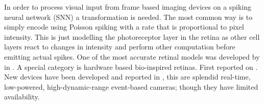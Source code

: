 In order to process visual input from frame based imaging devices on a spiking 
neural network (SNN) a transformation is needed. The most common way is to 
simply encode using Poisson spiking with a rate that is proportional to pixel
intensity. This is just modelling the photoreceptor layer in the retina as 
other cell layers react to changes in intensity\cite{webvision} and perform 
other computation before emitting actual spikes. One of the most accurate 
retinal models was developed by \citeauthor{virtual-retina} in 
\cite{virtual-retina}. A special category is hardware based bio-inspired 
retinas. First reported on \cite{carver-mead}. New devices have been developed 
and reported in \cite{aer-retina-bernabe, dvs-zurich}, this are splendid 
real-time, low-powered, high-dynamic-range event-based cameras; though they 
have limited availability.

